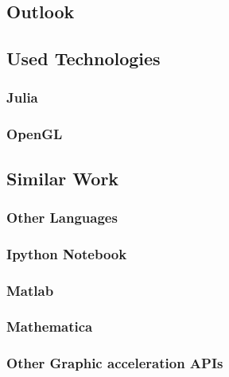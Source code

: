 \subsection{Outlook}

\subsection{Used Technologies}

\subsubsection{Julia}
\subsubsection{OpenGL}


\subsection{Similar Work}

\subsubsection{Other Languages}
\subsubsection{Ipython Notebook}
\subsubsection{Matlab}
\subsubsection{Mathematica}
\subsubsection{Other Graphic acceleration APIs}